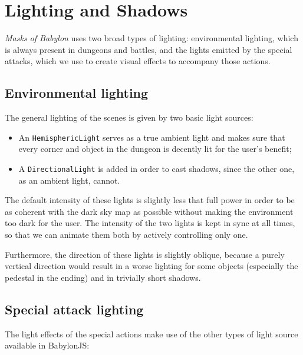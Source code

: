 
\chapter{Lighting and Shadows}

\textit{Masks of Babylon} uses two broad types of lighting: environmental lighting, which is always present in dungeons and battles, and the lights emitted by the special attacks, which we use to create visual effects to accompany those actions.

\section{Environmental lighting}

The general lighting of the scenes is given by two basic light sources:

\begin{itemize}
    \item An \texttt{HemisphericLight} serves as a true ambient light and makes sure that every corner and object in the dungeon is decently lit for the user's benefit;
    \item A \texttt{DirectionalLight} is added in order to cast shadows, since the other one, as an ambient light, cannot.
\end{itemize}

The default intensity of these lights is slightly less that full power in order to be as coherent with the dark sky map as possible without making the environment too dark for the user. The intensity of the two lights is kept in sync at all times, so that we can animate them both by actively controlling only one.

Furthermore, the direction of these lights is slightly oblique, because a purely vertical direction would result in a worse lighting for some objects (especially the pedestal in the ending) and in trivially short shadows.

\section{Special attack lighting}

The light effects of the special actions make use of the other types of light source available in BabylonJS:


